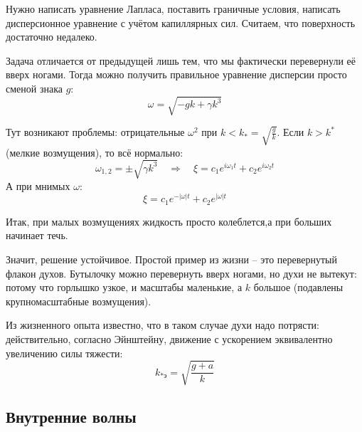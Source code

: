 Нужно написать уравнение Лапласа, поставить граничные условия, написать дисперсионное уравнение с учётом капиллярных сил. 
Считаем, что поверхность достаточно недалеко.

Задача отличается от предыдущей лишь тем, что мы фактически перевернули её вверх ногами. Тогда можно получить правильное  уравнение дисперсии просто сменой знака $g$:
\begin{equation}
    \omega = \sqrt{-gk+\gamma k^3}
\end{equation}


Тут возникают проблемы: отрицательные $\omega^2$ при $k < k_* = \sqrt{\frac{g}{k}}$. Если $k>k^*$ (мелкие возмущения), то всё нормально:
\begin{equation}
    \omega_{1,2} = \pm\sqrt{\gamma k^3}
    \quad \Rightarrow \quad
    \xi = c_1e^{i\omega_1 t}+c_2e^{i\omega_2 t}
\end{equation}
А при мнимых $\omega$:
\begin{equation}
    \xi = c_1e^{-|\omega|t}+c_2e^{|\omega|t}
\end{equation}

Итак, при малых возмущениях жидкость просто колеблется,а при больших начинает течь.

Значит, решение устойчивое. Простой пример из жизни -- это перевернутый флакон духов. Бутылочку можно перевернуть вверх ногами, но духи не вытекут:
потому что горлышко узкое, и масштабы маленькие, а $k$ большое (подавлены крупномасштабные возмущения). 

Из жизненного опыта известно, что в таком случае духи надо потрясти: действительно, согласно Эйнштейну, движение с ускорением эквивалентно увеличению силы тяжести:
\begin{equation}
    k_{*\text{э}} = \sqrt{\frac{g+a}{k}}
\end{equation}

\newpage
\subsection{Внутренние волны}


